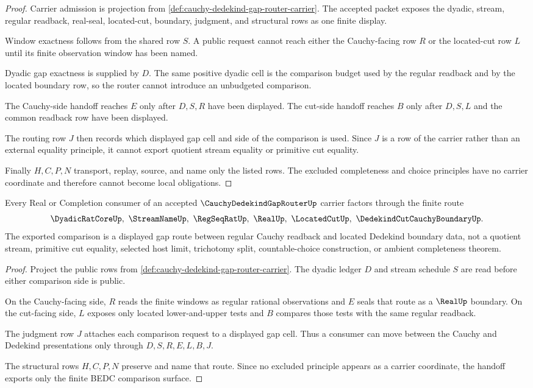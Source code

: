 \begin{proof}
Carrier admission is projection from \autoref{def:cauchy-dedekind-gap-router-carrier}. The accepted packet exposes the dyadic, stream, regular readback, real-seal, located-cut, boundary, judgment, and structural rows as one finite display.

Window exactness follows from the shared row $S$. A public request cannot reach either the Cauchy-facing row $R$ or the located-cut row $L$ until its finite observation window has been named.

Dyadic gap exactness is supplied by $D$. The same positive dyadic cell is the comparison budget used by the regular readback and by the located boundary row, so the router cannot introduce an unbudgeted comparison.

The Cauchy-side handoff reaches $E$ only after $D,S,R$ have been displayed. The cut-side handoff reaches $B$ only after $D,S,L$ and the common readback row have been displayed.

The routing row $J$ then records which displayed gap cell and side of the comparison is used. Since $J$ is a row of the carrier rather than an external equality principle, it cannot export quotient stream equality or primitive cut equality.

Finally $H,C,P,N$ transport, replay, source, and name only the listed rows. The excluded completeness and choice principles have no carrier coordinate and therefore cannot become local obligations.
\end{proof}

\begin{theorem}\label{thm:cauchy-dedekind-gap-router-l10-handoff}
Every Real or Completion consumer of an accepted $\CauchyDedekindGapRouterUp$ carrier factors through the finite route
$$
\DyadicRatCoreUp,\ \StreamNameUp,\ \RegSeqRatUp,\ \RealUp,\ \LocatedCutUp,\ \DedekindCutCauchyBoundaryUp .
$$
The exported comparison is a displayed gap route between regular Cauchy readback and located Dedekind boundary data, not a quotient stream, primitive cut equality, selected host limit, trichotomy split, countable-choice construction, or ambient completeness theorem.
\end{theorem}
\begin{proof}
Project the public rows from \autoref{def:cauchy-dedekind-gap-router-carrier}. The dyadic ledger $D$ and stream schedule $S$ are read before either comparison side is public.

On the Cauchy-facing side, $R$ reads the finite windows as regular rational observations and $E$ seals that route as a $\RealUp$ boundary. On the cut-facing side, $L$ exposes only located lower-and-upper tests and $B$ compares those tests with the same regular readback.

The judgment row $J$ attaches each comparison request to a displayed gap cell. Thus a consumer can move between the Cauchy and Dedekind presentations only through $D,S,R,E,L,B,J$.

The structural rows $H,C,P,N$ preserve and name that route. Since no excluded principle appears as a carrier coordinate, the handoff exports only the finite BEDC comparison surface.
\end{proof}

